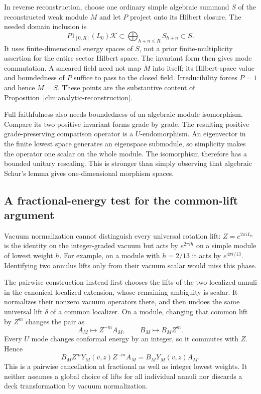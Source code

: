 In reverse reconstruction, choose one ordinary simple algebraic
summand $S$ of the reconstructed weak module $M$ and let $P$
project onto its Hilbert closure. The needed domain inclusion is
\[
 P1_{[0,R]}(L_0)\mathcal K
   \subset\bigoplus_{h+n\le R}S_{h+n}\subset S.
\]
It uses finite-dimensional energy spaces of $S$, not a prior
finite-multiplicity assertion for the entire sector Hilbert space.
The invariant form then gives mode commutation. A smeared field
need not map $M$ into itself; its Hilbert-space value and boundedness
of $P$ suffice to pass to the closed field. Irreducibility forces
$P=1$ and hence $M=S$. These points are the substantive content
of Proposition~\ref{clm:analytic-reconstruction}.

Full faithfulness also needs boundedness of an algebraic module
isomorphism. Compare its two positive invariant forms grade by
grade. The resulting positive grade-preserving comparison operator
is a $U$-endomorphism. An eigenvector in the finite lowest space
generates an eigenspace submodule, so simplicity makes the operator
one scalar on the whole module. The isomorphism therefore has a
bounded unitary rescaling. This is stronger than simply observing
that algebraic Schur's lemma gives one-dimensional morphism spaces.

\subsection{A fractional-energy test for the common-lift argument}

Vacuum normalization cannot distinguish every universal rotation
lift: $Z=e^{2\pi iL_0}$ is the identity on the integer-graded
vacuum but acts by $e^{2\pi ih}$ on a simple module of lowest
weight $h$. For example, on a module with $h=2/13$ it acts by
$e^{4\pi i/13}$. Identifying two annulus lifts only from their
vacuum scalar would miss this phase.

The pairwise construction instead first chooses the lifts of the
two localized annuli in the canonical localized extension, whose
remaining ambiguity is scalar. It normalizes their nonzero vacuum
operators there, and then undoes the same universal lift
$\widetilde\delta$ of a common localizer. On a module, changing
that common lift by $Z^m$ changes the pair as
\[
 A_M\longmapsto Z^{-m}A_M,
 \qquad B_M\longmapsto B_MZ^m.
\]
Every $U$ mode changes conformal energy by an integer, so it
commutes with $Z$. Hence
\[
 B_MZ^mY_M(v,z)Z^{-m}A_M=B_MY_M(v,z)A_M.
\]
This is a pairwise cancellation at fractional as well as integer
lowest weights. It neither assumes a global choice of lifts for
all individual annuli nor discards a deck transformation by
vacuum normalization.

